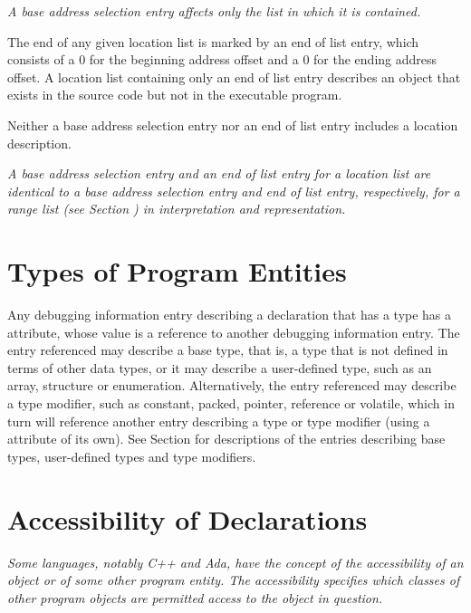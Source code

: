 \textit{A base address selection entry 
affects only the list in which it is contained.}

The end of any given location list is marked by an end of
list entry, which consists of a 0 for the beginning address
offset and a 0 for the ending address offset. A location list
containing only an end of list entry describes an object that
exists in the source code but not in the executable program.

Neither a base address selection entry nor an end of list
entry includes a location description.

\textit{A base address selection entry and an end of list
entry for a location list are identical to a base address
selection entry and end of list entry, respectively, for a
range list 
(see Section ) 
in interpretation
and representation.}






\section{Types of Program Entities}
\label{chap:typesofprogramentities}
Any debugging information entry describing a declaration that
has a type has a  attribute, whose value is a
reference to another debugging information entry. The entry
referenced may describe a base type, that is, a type that is
not defined in terms of other data types, or it may describe a
user-defined type, such as an array, structure or enumeration.
Alternatively, the entry referenced may describe a type
modifier, such as constant, packed, pointer, reference or
volatile, which in turn will reference another entry describing
a type or type modifier (using a  attribute of its
own). See 
Section   
for descriptions of the entries describing
base types, user-defined types and type modifiers.



\section{Accessibility of Declarations}
\label{chap:accessibilityofdeclarations}
\textit{Some languages, notably C++ and Ada, have the concept of
the accessibility of an object or of some other program
entity. The accessibility specifies which classes of other
program objects are permitted access to the object in question.}

